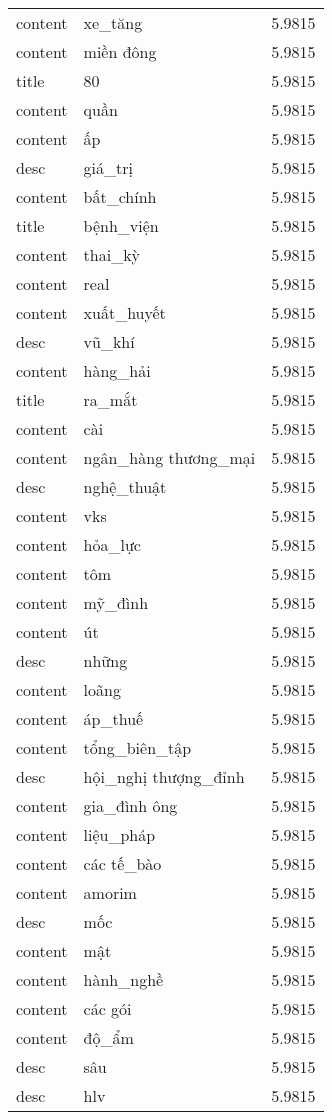 \documentclass{article}
\begin{document}
\begin{tabular}{lll}
content & xe\_tăng & 5.9815\\
content & miền đông & 5.9815\\
title & 80 & 5.9815\\
content & quần & 5.9815\\
content & ấp & 5.9815\\
desc & giá\_trị & 5.9815\\
content & bất\_chính & 5.9815\\
title & bệnh\_viện & 5.9815\\
content & thai\_kỳ & 5.9815\\
content & real & 5.9815\\
content & xuất\_huyết & 5.9815\\
desc & vũ\_khí & 5.9815\\
content & hàng\_hải & 5.9815\\
title & ra\_mắt & 5.9815\\
content & cài & 5.9815\\
content & ngân\_hàng thương\_mại & 5.9815\\
desc & nghệ\_thuật & 5.9815\\
content & vks & 5.9815\\
content & hỏa\_lực & 5.9815\\
content & tôm & 5.9815\\
content & mỹ\_đình & 5.9815\\
content & út & 5.9815\\
desc & những & 5.9815\\
content & loãng & 5.9815\\
content & áp\_thuế & 5.9815\\
content & tổng\_biên\_tập & 5.9815\\
desc & hội\_nghị thượng\_đỉnh & 5.9815\\
content & gia\_đình ông & 5.9815\\
content & liệu\_pháp & 5.9815\\
content & các tế\_bào & 5.9815\\
content & amorim & 5.9815\\
desc & mốc & 5.9815\\
content & mật & 5.9815\\
content & hành\_nghề & 5.9815\\
content & các gói & 5.9815\\
content & độ\_ẩm & 5.9815\\
desc & sâu & 5.9815\\
desc & hlv & 5.9815\\

\end{tabular}
\end{document}

